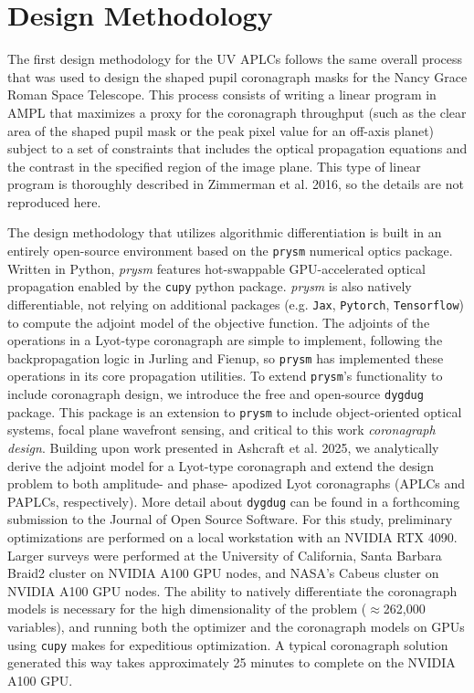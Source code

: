 \documentclass[]{spie}  %
\begin{document}
\section{Design Methodology}
\label{sec:design_methods}

The first design methodology for the UV APLCs follows the same overall process that was used to design the shaped pupil coronagraph masks for the Nancy Grace Roman Space Telescope\cite{Gersh-Range_2022,Riggs_2017}.  This process consists of writing a linear program in AMPL\cite{AMPL} that maximizes a proxy for the coronagraph throughput (such as the clear area of the shaped pupil mask or the peak pixel value for an off-axis planet) subject to a set of constraints that includes the optical propagation equations and the contrast in the specified region of the image plane. This type of linear program is thoroughly described in Zimmerman et al. 2016\cite{Zimmerman_2016}, so the details are not reproduced here.

The design methodology that utilizes algorithmic differentiation is built in an entirely open-source environment based on the \texttt{prysm} numerical optics package. Written in Python, \emph{prysm} features hot-swappable GPU-accelerated optical propagation enabled by the \texttt{cupy} python package. \emph{prysm} is also natively differentiable, not relying on additional packages (e.g. \texttt{Jax}, \texttt{Pytorch}, \texttt{Tensorflow}) to compute the adjoint model of the objective function. The adjoints of the operations in a Lyot-type coronagraph are simple to implement, following the backpropagation logic in Jurling and Fienup\cite{Jurling:14}, so \texttt{prysm} has implemented these operations in its core propagation utilities. To extend \texttt{prysm}'s functionality to include coronagraph design, we introduce the free and open-source \texttt{dygdug} package. This package is an extension to \texttt{prysm} to include object-oriented optical systems, focal plane wavefront sensing, and critical to this work \emph{coronagraph design}. Building upon work presented in Ashcraft et al. 2025\cite{Ashcraft_2025}, we analytically derive the adjoint model for a Lyot-type coronagraph and extend the design problem to both amplitude- and phase- apodized Lyot coronagraphs (APLCs and PAPLCs, respectively). More detail about \texttt{dygdug} can be found in a forthcoming submission to the Journal of Open Source Software. For this study, preliminary optimizations are performed on a local workstation with an NVIDIA RTX 4090. Larger surveys were performed at the University of California, Santa Barbara Braid2 cluster on NVIDIA A100 GPU nodes, and NASA's Cabeus cluster on NVIDIA A100 GPU nodes. The ability to natively differentiate the coronagraph models is necessary for the high dimensionality of the problem ($\approx$262,000 variables), and running both the optimizer and the coronagraph models on GPUs using \texttt{cupy} makes for expeditious optimization. A typical coronagraph solution generated this way takes approximately 25 minutes to complete on the NVIDIA A100 GPU.
\end{document}

